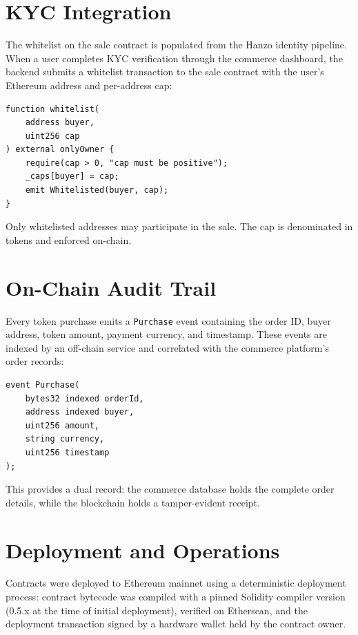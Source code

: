 \documentclass[11pt,a4paper]{article}
\begin{document}
\section{KYC Integration}

The whitelist on the sale contract is populated from the Hanzo identity pipeline. When a user completes KYC verification through the commerce dashboard, the backend submits a whitelist transaction to the sale contract with the user's Ethereum address and per-address cap:

\begin{lstlisting}[language=Solidity,caption=Whitelist management.]
function whitelist(
    address buyer,
    uint256 cap
) external onlyOwner {
    require(cap > 0, "cap must be positive");
    _caps[buyer] = cap;
    emit Whitelisted(buyer, cap);
}
\end{lstlisting}

Only whitelisted addresses may participate in the sale. The cap is denominated in tokens and enforced on-chain.

\section{On-Chain Audit Trail}

Every token purchase emits a \texttt{Purchase} event containing the order ID, buyer address, token amount, payment currency, and timestamp. These events are indexed by an off-chain service and correlated with the commerce platform's order records:

\begin{lstlisting}[language=Solidity,caption=Receipt event.]
event Purchase(
    bytes32 indexed orderId,
    address indexed buyer,
    uint256 amount,
    string currency,
    uint256 timestamp
);
\end{lstlisting}

This provides a dual record: the commerce database holds the complete order details, while the blockchain holds a tamper-evident receipt.

\section{Deployment and Operations}

Contracts were deployed to Ethereum mainnet using a deterministic deployment process: contract bytecode was compiled with a pinned Solidity compiler version (0.5.x at the time of initial deployment), verified on Etherscan, and the deployment transaction signed by a hardware wallet held by the contract owner.
\end{document}
